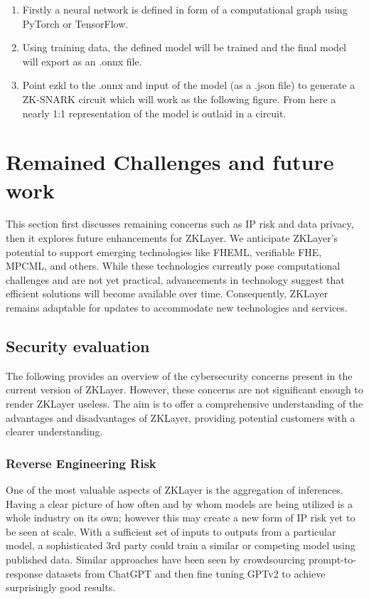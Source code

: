 \documentclass[conference]{IEEEtran}
\begin{document}
\begin{enumerate}

    \item 	Firstly a neural network is defined in form of a computational graph using PyTorch or TensorFlow.

    \item	Using training data, the defined model will be trained and the final model will export as an .onnx file.

    \item	Point ezkl to the .onnx and input of the model (as a .json file) to generate a ZK-SNARK circuit which will work as the following figure. From here a nearly 1:1 representation of the model is outlaid in a circuit.

\end{enumerate}


\section{Remained Challenges and future work}

This section first discusses remaining concerns such as IP risk and data privacy, then it explores future enhancements for ZKLayer. We anticipate ZKLayer's potential to support emerging technologies like FHEML, verifiable FHE, MPCML, and others. While these technologies currently pose computational challenges and are not yet practical, advancements in technology suggest that efficient solutions will become available over time. Consequently, ZKLayer remains adaptable for updates to accommodate new technologies and services.

\subsection{Security evaluation}

The following provides an overview of the cybersecurity concerns present in the current version of ZKLayer. However, these concerns are not significant enough to render ZKLayer useless. The aim is to offer a comprehensive understanding of the advantages and disadvantages of ZKLayer, providing potential customers with a clearer understanding.

\subsubsection{Reverse Engineering Risk}

One of the most valuable aspects of ZKLayer is the aggregation of inferences. Having a clear picture of how often and by whom models are being utilized is a whole industry on its own; however this may create a new form of IP risk yet to be seen at scale. With a sufficient set of inputs to outputs from a particular model, a sophisticated 3rd party could train a similar or competing model using published data. Similar approaches have been seen by crowdsourcing prompt-to-response datasets from ChatGPT and then fine tuning GPTv2 to achieve surprisingly good results.
\end{document}
